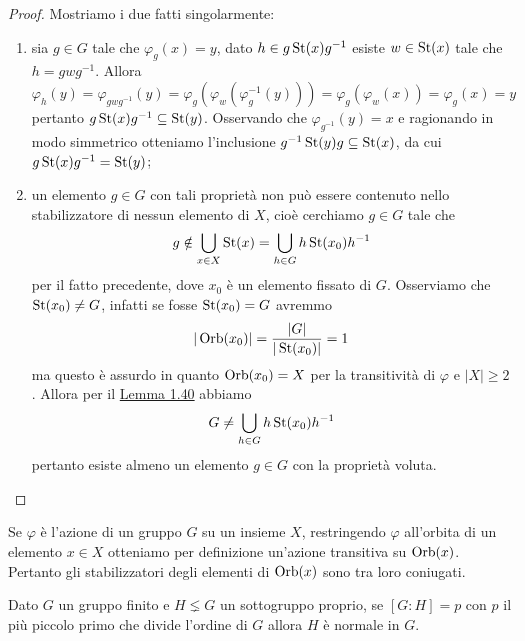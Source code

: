 \documentclass[11pt]{scrartcl}
\begin{document}
\begin{proof}
    Mostriamo i due fatti singolarmente:
    \begin{enumerate}[(1)]
        \item sia $g \in G$ tale che $\varphi_g(x) = y$, dato 
        $h \in g\operatorname{St}(x)g^{-1}$ esiste $w \in \operatorname{St}(x)$ tale che $h = gwg^{-1}$. 
        Allora
        \[
            \varphi_h(y) = \varphi_{gwg^{-1}}(y) = 
            \varphi_g(\varphi_w(\varphi_g^{-1}(y))) = \varphi_g(\varphi_w(x)) =
            \varphi_g(x) = y
        \]pertanto $g\operatorname{St}(x)g^{-1} \subseteq \operatorname{St}(y)$. Osservando che 
        $\varphi_{g^{-1}}(y) = x$ e ragionando in modo simmetrico otteniamo
        l'inclusione $g^{-1}\operatorname{St}(y)g \subseteq \operatorname{St}(x)$, da cui $g\operatorname{St}(x)g^{-1} = \operatorname{St}(y)$;
        \item un elemento $g \in G$ con tali proprietà non può essere contenuto 
        nello stabilizzatore di nessun elemento di $X$, cioè cerchiamo $g \in G$
        tale che
        \[
            g \notin \bigcup_{x \in X} \operatorname{St}(x) = \bigcup_{h \in G}h\operatorname{St}(x_0)h^{-1}
        \]per il fatto precedente, dove $x_0$ è un elemento fissato di $G$. Osserviamo che 
        $\operatorname{St}(x_0) \neq G$, infatti se fosse $\operatorname{St}(x_0) = G$ avremmo 
        \[
            |\operatorname{Orb}(x_0)| = \frac{|G|}{|\operatorname{St}(x_0)|} = 1
        \]ma questo è assurdo in quanto $\operatorname{Orb}(x_0) = X$ per la transitività di 
        $\varphi$ e $|X|\geqslant 2$. Allora per il \hyperref[lemma1.40]{Lemma 1.40}
        abbiamo 
        \[
            G \neq \bigcup_{h \in G}h\operatorname{St}(x_0)h^{-1}
        \]pertanto esiste almeno un elemento $g\in G$ con la proprietà voluta.
    \end{enumerate}
\end{proof}

\begin{remark}
    Se $\varphi$ è l'azione di un gruppo $G$ su un insieme $X$, restringendo
    $\varphi$ all'orbita di un elemento $x \in X$ otteniamo per definizione
    un'azione transitiva su $\operatorname{Orb}(x)$. Pertanto gli stabilizzatori degli elementi 
    di $\operatorname{Orb}(x)$ sono tra loro coniugati.
\end{remark}

\begin{proposition}
    Dato $G$ un gruppo finito e $H \lneq G$ un sottogruppo proprio, se $[G:H] = p$
    con $p$ il più piccolo primo che divide l'ordine di $G$ allora $H$ è normale
    in $G$.
\end{proposition}
\end{document}
